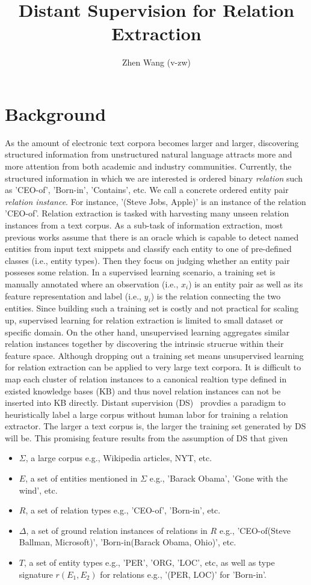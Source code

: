 \documentclass[10pt]{article} %
\title{Distant Supervision for Relation Extraction}
\author{Zhen Wang (v-zw)}
\theoremstyle{definition}
\theoremstyle{definition}
\begin{document}
\maketitle
\section{Background}
As the amount of electronic text corpora becomes larger and larger, discovering structured information from unstructured natural language attracts more and more attention from both academic and industry communities. 
Currently, the structured information in which we are interested is ordered binary \emph{relation} such as 'CEO-of', 'Born-in', 'Contains', etc. 
We call a concrete ordered entity pair \emph{relation instance}. 
For instance, '(Steve Jobs, Apple)' is an instance of the relation 'CEO-of'. 
Relation extraction is tasked with harvesting many unseen relation instances from a text corpus. 
As a sub-task of information extraction, most previous works assume that there is an oracle which is capable to detect named entities from input text snippets and classify each entity to one of pre-defined classes (i.e., entity types). 
Then they focus on judging whether an entity pair posseses some relation. 
In a supervised learning scenario, a training set is manually annotated where an observation (i.e., $x_i$) is an entity pair as well as its feature representation and label (i.e., $y_i$) is the relation connecting the two entities. 
Since building such a training set is costly and not practical for scaling up, supervised learning for relation extraction is limited to small dataset or specific domain. 
On the other hand, unsupervised learning aggregates similar relation instances together by discovering the intrinsic strucrue within their feature space. 
Although dropping out a training set means unsupervised learning for relation extraction can be applied to very large text corpora. 
It is difficult to map each cluster of relation instances to a canonical realtion type defined in existed knowledge bases (KB) and thus novel relation instances can not be inserted into KB directly. 
Distant supervision (DS)~\cite{mintz} provdies a paradigm to heuristically label a large corpus without human labor for training a relation extractor. 
The larger a text corpus is, the larger the training set generated by DS will be. 
This promising feature results from the assumption of DS that given 
\begin{itemize}
\item $\Sigma$, a large corpus e.g., Wikipedia articles, NYT, etc. 
\item $E$, a set of entities mentioned in $\Sigma$ e.g., 'Barack Obama', 'Gone with the wind', etc. 
\item $R$, a set of relation types e.g., 'CEO-of', 'Born-in', etc. 
\item $\Delta$, a set of ground relation instances of relations in $R$ e.g., 'CEO-of(Steve Ballman, Microsoft)', 'Born-in(Barack Obama, Ohio)', etc. 
\item $T$, a set of entity types e.g., 'PER', 'ORG, 'LOC', etc, as well as type signature $r(E_1,E_2)$ for relations e.g., '(PER, LOC)' for 'Born-in'. 
\end{itemize}
\end{document}
